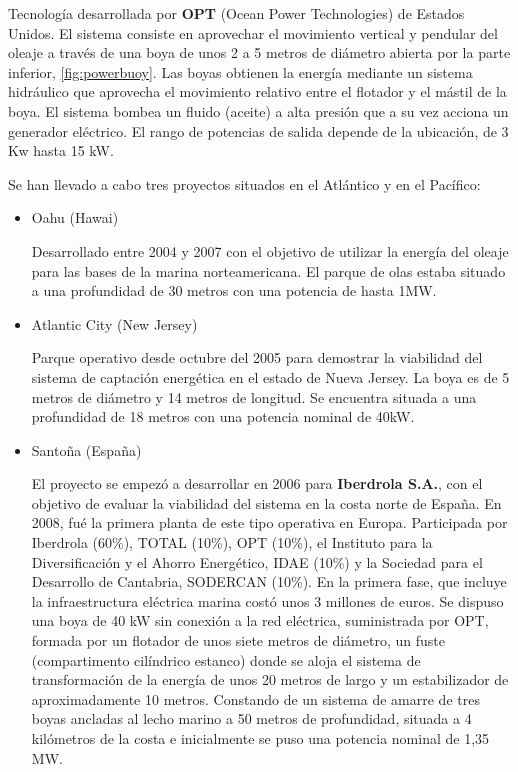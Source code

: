 \begin{itemize}
  Tecnología desarrollada por \textbf{OPT} (Ocean Power Technologies) de
  Estados Unidos. El sistema consiste en aprovechar el movimiento
  vertical y pendular del oleaje a través de una boya de unos 2 a 5
  metros de diámetro abierta por la parte inferior, \autoref{fig:powerbuoy}. Las boyas obtienen
  la energía mediante un sistema hidráulico que aprovecha el movimiento
  relativo entre el flotador y el mástil de la boya. El sistema bombea
  un fluido (aceite) a alta presión que a su vez acciona un generador
  eléctrico. El rango de potencias de salida depende de la ubicación, de
  3 Kw hasta 15 kW.



  Se han llevado a cabo tres proyectos situados en el Atlántico y en el
  Pacífico:

  \begin{itemize}
  \item
    Oahu (Hawai)

    Desarrollado entre 2004 y 2007 con el objetivo de utilizar la
    energía del oleaje para las bases de la marina norteamericana. El
    parque de olas estaba situado a una profundidad de 30 metros con una
    potencia de hasta 1MW.
  \item
    Atlantic City (New Jersey)

    Parque operativo desde octubre del 2005 para demostrar la viabilidad
    del sistema de captación energética en el estado de Nueva Jersey. La
    boya es de 5 metros de diámetro y 14 metros de longitud. Se
    encuentra situada a una profundidad de 18 metros con una potencia
    nominal de 40kW.
  \item
    Santoña (España)

    El proyecto se empezó a desarrollar en 2006 para \textbf{Iberdrola
    S.A.}, con el objetivo de evaluar la viabilidad del sistema en la
    costa norte de España. En 2008, fué la primera planta de este tipo
    operativa en Europa. Participada por Iberdrola (60\%), TOTAL (10\%),
    OPT (10\%), el Instituto para la Diversificación y el Ahorro
    Energético, IDAE (10\%) y la Sociedad para el Desarrollo de
    Cantabria, SODERCAN (10\%). En la primera fase, que incluye la
    infraestructura eléctrica marina costó unos 3 millones de euros. Se
    dispuso una boya de 40 kW sin conexión a la red eléctrica,
    suministrada por OPT, formada por un flotador de unos siete metros
    de diámetro, un fuste (compartimento cilíndrico estanco) donde se
    aloja el sistema de transformación de la energía de unos 20 metros
    de largo y un estabilizador de aproximadamente 10 metros. Constando
    de un sistema de amarre de tres boyas ancladas al lecho marino a 50
    metros de profundidad, situada a 4 kilómetros de la costa e
    inicialmente se puso una potencia nominal de 1,35 MW.


\end{itemize}
\end{itemize}
